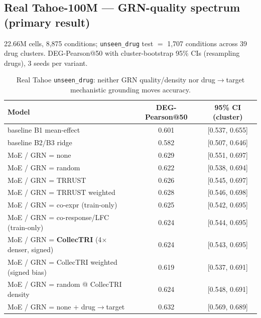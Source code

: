 \documentclass[11pt]{article}
\begin{document}
\subsection{Real Tahoe-100M --- GRN-quality spectrum (primary result)}
22.66M cells, 8{,}875 conditions; \texttt{unseen\_drug} test $=$ 1{,}707 conditions across 39 drug
clusters. DEG-Pearson@50 with cluster-bootstrap 95\% CIs (resampling drugs), 3 seeds per variant.

\begin{table}[h]\centering
\begin{tabular}{lcc}
\toprule
Model & DEG-Pearson@50 & 95\% CI (cluster) \\
\midrule
baseline B1 mean-effect & 0.601 & [0.537, 0.655] \\
baseline B2/B3 ridge & 0.582 & [0.507, 0.646] \\
MoE / GRN = none & 0.629 & [0.551, 0.697] \\
MoE / GRN = random & 0.622 & [0.538, 0.694] \\
MoE / GRN = TRRUST & 0.626 & [0.545, 0.697] \\
MoE / GRN = TRRUST weighted & 0.628 & [0.546, 0.698] \\
MoE / GRN = co-expr (train-only) & 0.625 & [0.542, 0.695] \\
MoE / GRN = co-response/LFC (train-only) & 0.624 & [0.544, 0.695] \\
MoE / GRN = \textbf{CollecTRI} (4$\times$ denser, signed) & 0.624 & [0.543, 0.695] \\
MoE / GRN = CollecTRI weighted (signed bias) & 0.619 & [0.537, 0.691] \\
MoE / GRN = random @ CollecTRI density & 0.624 & [0.548, 0.691] \\
MoE / GRN = none $+$ drug$\rightarrow$target & 0.632 & [0.569, 0.689] \\
\bottomrule
\end{tabular}
\caption{Real Tahoe \texttt{unseen\_drug}: neither GRN quality/density nor drug$\rightarrow$target
mechanistic grounding moves accuracy.}
\end{table}
\end{document}
